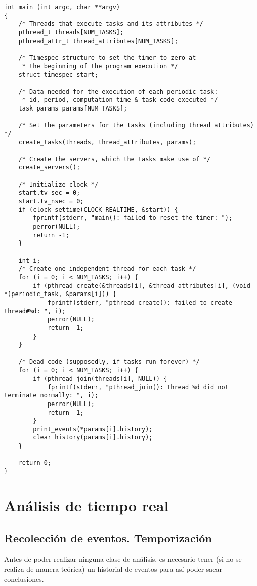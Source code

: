 \documentclass[11pt,spanish]{article}
\begin{document}
\begin{lstlisting}[style=c]
int main (int argc, char **argv)
{
    /* Threads that execute tasks and its attributes */
    pthread_t threads[NUM_TASKS];
    pthread_attr_t thread_attributes[NUM_TASKS];

    /* Timespec structure to set the timer to zero at 
     * the beginning of the program execution */
    struct timespec start;

    /* Data needed for the execution of each periodic task:
     * id, period, computation time & task code executed */
    task_params params[NUM_TASKS];
    
    /* Set the parameters for the tasks (including thread attributes) */
    create_tasks(threads, thread_attributes, params);

    /* Create the servers, which the tasks make use of */
    create_servers();

    /* Initialize clock */
    start.tv_sec = 0;
    start.tv_nsec = 0;
    if (clock_settime(CLOCK_REALTIME, &start)) {
        fprintf(stderr, "main(): failed to reset the timer: ");
        perror(NULL);
        return -1;
    }

    int i;
    /* Create one independent thread for each task */
    for (i = 0; i < NUM_TASKS; i++) {
        if (pthread_create(&threads[i], &thread_attributes[i], (void *)periodic_task, &params[i])) {
            fprintf(stderr, "pthread_create(): failed to create thread#%d: ", i);
            perror(NULL);
            return -1;
        }
    }

    /* Dead code (supposedly, if tasks run forever) */
    for (i = 0; i < NUM_TASKS; i++) {
        if (pthread_join(threads[i], NULL)) {
            fprintf(stderr, "pthread_join(): Thread %d did not terminate normally: ", i);
            perror(NULL);
            return -1;
        }
        print_events(*params[i].history);
        clear_history(params[i].history);
    }

    return 0;
}
\end{lstlisting}

\section{Análisis de tiempo real}

\subsection{Recolección de eventos. Temporización}
Antes de poder realizar ninguna clase de análisis, es necesario tener (si no se realiza
de manera teórica) un historial de eventos para así poder sacar conclusiones.
\end{document}
